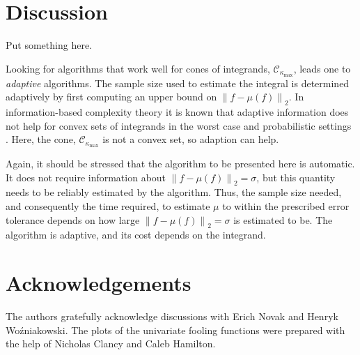 \documentclass[graybox]{svmult}
\newcommand{\cc}{\mathcal{C}}
\newcommand{\norm}[2][{}]{\ensuremath{\left \lVert #2 \right \rVert}_{#1}}
\begin{document}
\section{Discussion}

Put something here.

Looking for algorithms that work well for cones of integrands, $\cc_{\kappa_{\max}}$, leads one to \emph{adaptive} algorithms.  The sample size used to estimate the integral is determined adaptively by first computing an upper bound on $\norm[2]{f-\mu(f)}$.  In information-based complexity theory it is known that adaptive information does not help for convex sets of integrands in the worst case and probabilistic settings \citep[Chapter 4, Theorem 5.2.1; Chapter 8, Corollary 5.3.1]{TraWasWoz88}.  Here, the cone, $\cc_{\kappa_{\max}}$ is not a convex set, so adaption can help.

Again, it should be stressed that the algorithm to be presented here is automatic.  It does not require information about $\norm[2]{f-\mu(f)}=\sigma$, but this quantity needs to be reliably estimated by the algorithm. Thus, the sample size needed, and consequently the time required, to estimate $\mu$ to within the prescribed error tolerance depends on how large $\norm[2]{f-\mu(f)}=\sigma$ is estimated to be.  The algorithm is adaptive, and its cost depends on the integrand.



\section*{Acknowledgements} The authors gratefully acknowledge discussions with Erich Novak and Henryk Wo\'zniakowski.  The plots of the univariate fooling functions were prepared with the help of Nicholas Clancy and Caleb Hamilton.



\end{document}
